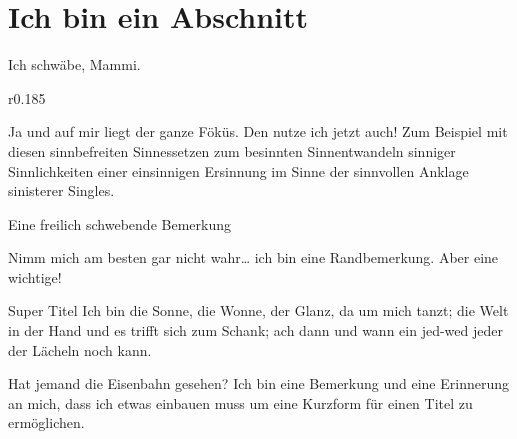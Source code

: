 \documentclass[twocolumn]{article}
\begin{document}
\section{Ich bin ein Abschnitt}
\begin{figure*}
    \begin{definition}{Ich schwäbe, Mammi.}
        \vspace*{-\baselineskip}\begin{wrapfigure}[3]{r}{0.185\linewidth}
            \centering\vspace*{-2.33\baselineskip}
        \end{wrapfigure}Ja und auf mir liegt der ganze Föküs. Den nutze ich jetzt auch! Zum Beispiel mit diesen sinnbefreiten Sinnessetzen zum besinnten Sinnentwandeln sinniger Sinnlichkeiten einer einsinnigen Ersinnung im Sinne der sinnvollen Anklage sinisterer Singles. 
    \end{definition}
\end{figure*}
\begin{figure*}
    \begin{bemerkung}{Eine freilich schwebende Bemerkung}
        \blindtext
    \end{bemerkung}
\end{figure*}

    \blindtext
    \begin{bemerkung*}{Nimm mich am besten gar nicht wahr\ldots}
        ich bin eine Randbemerkung. Aber eine wichtige!
    \end{bemerkung*}
    \blindtext[4]

    \begin{definition}{Super Titel}
        Ich bin die Sonne, die Wonne, der Glanz, da um mich tanzt; die Welt in der Hand und es trifft sich zum
        Schank; ach dann und wann ein jed-wed jeder der Lächeln noch kann.
    \end{definition}

    \blindtext[2]

    \begin{bemerkung}{Hat jemand die Eisenbahn gesehen?}
        Ich bin eine Bemerkung und eine Erinnerung an mich, dass ich etwas einbauen
        muss um eine Kurzform für einen Titel zu ermöglichen.
    \end{bemerkung}
\end{document}
